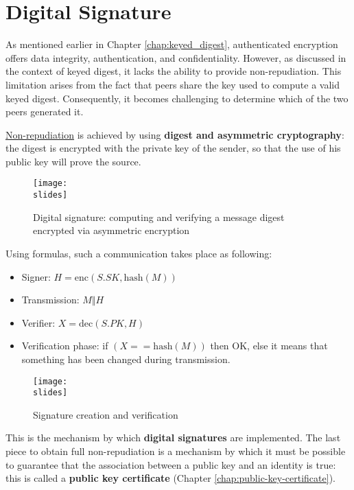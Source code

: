 \section{Digital Signature}\label{chap:digital_signature}

As mentioned earlier in Chapter \ref{chap:keyed_digest}, authenticated encryption offers data integrity, authentication, and confidentiality. However, as discussed in the context of keyed digest, it lacks the ability to provide non-repudiation. This limitation arises from the fact that peers share the key used to compute a valid keyed digest. Consequently, it becomes challenging to determine which of the two peers generated it.

\underline{Non-repudiation} is achieved by using \textbf{digest and asymmetric cryptography}: the digest is encrypted with the private key of the sender, so that the use of his public key will prove the source.

\begin{figure}[h]
    \centering
    \texttt{[image: \\slides]}
    \caption{Digital signature: computing and verifying a
    message digest encrypted via asymmetric encryption}
\end{figure}

Using formulas, such a communication takes place as following:
\begin{itemize}
    \item Signer: $H = \text{enc}(S.SK, \text{hash}(M))$
    \item Transmission: $M \Vert H$
    \item Verifier: $X = \text{dec}(S.PK, H)$
    \item Verification phase: if $(X == \text{hash}(M))$ then OK, else it means that something has been changed during transmission.
\end{itemize}


\begin{figure}[h]
    \centering
    \texttt{[image: \\slides]}
    \caption{Signature creation and verification}
\end{figure}

This is the mechanism by which \textbf{digital signatures} are implemented. 
The last piece to obtain full non-repudiation is a mechanism by which it must be possible to guarantee that the association between a public key and an identity is true: 
this is called a \textbf{public key certificate} (Chapter \ref{chap:public-key-certificate}).

